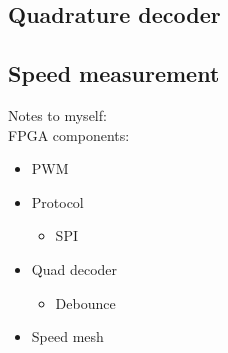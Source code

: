 \documentclass[../../../main]{subfiles}
\begin{document}
\subsection{Quadrature decoder}

\subsection{Speed measurement}
Notes to myself:\\
FPGA components:
\begin{itemize}
    \item PWM
    \item Protocol
        \begin{itemize}
            \item SPI
        \end{itemize} 
    \item Quad decoder
        \begin{itemize}
            \item Debounce
        \end{itemize}
    \item Speed mesh
\end{itemize}

\end{document}
